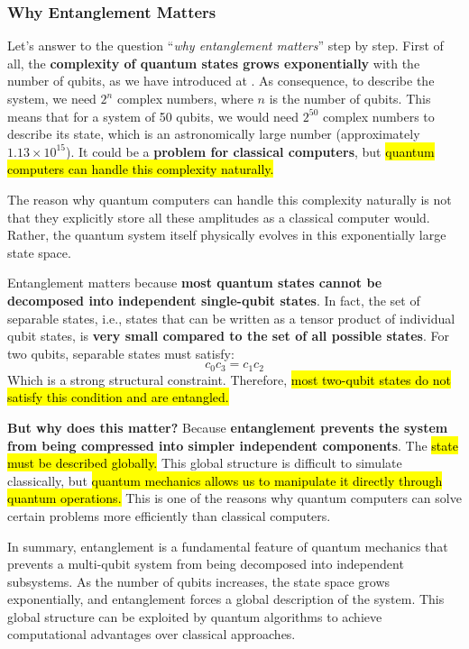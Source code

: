 \subsubsection{Why Entanglement Matters}\label{subsubsec:why-entanglement-matters}

Let's answer to the question ``\emph{why entanglement matters}'' step by step. First of all, the \textbf{complexity of quantum states grows exponentially} with the number of qubits, as we have introduced at . As consequence, to describe the system, we need $2^n$ complex numbers, where $n$ is the number of qubits. This means that for a system of 50 qubits, we would need $2^{50}$ complex numbers to describe its state, which is an astronomically large number (approximately $1.13 \times 10^{15}$). It could be a \textbf{problem for classical computers}, but \hl{quantum computers can handle this complexity naturally.}

\highspace
The reason why quantum computers can handle this complexity naturally is not that they explicitly store all these amplitudes as a classical computer would. Rather, the quantum system itself physically evolves in this exponentially large state space.

\highspace
Entanglement matters because \textbf{most quantum states cannot be decomposed into independent single-qubit states}. In fact, the set of separable states, i.e., states that can be written as a tensor product of individual qubit states, is \textbf{very small compared to the set of all possible states}. For two qubits, separable states must satisfy:
\begin{equation*}
    c_0 c_3 = c_1 c_2
\end{equation*}
Which is a strong structural constraint. Therefore, \hl{most two-qubit states do not satisfy this condition and are entangled.}

\highspace
\textcolor{Green3}{ \textbf{But why does this matter?}} Because \textbf{entanglement prevents the system from being compressed into simpler independent components}. The \hl{state must be described globally.} This global structure is difficult to simulate classically, but \hl{quantum mechanics allows us to manipulate it directly through quantum operations.} This is one of the reasons why quantum computers can solve certain problems more efficiently than classical computers.

\highspace
In summary, entanglement is a fundamental feature of quantum mechanics that prevents a multi-qubit system from being decomposed into independent subsystems. As the number of qubits increases, the state space grows exponentially, and entanglement forces a global description of the system. This global structure can be exploited by quantum algorithms to achieve computational advantages over classical approaches.